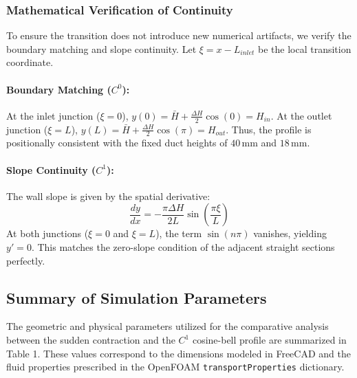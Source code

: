 \documentclass[12pt, a4paper]{article}
\begin{document}
\subsubsection{Mathematical Verification of Continuity}
To ensure the transition does not introduce new numerical artifacts, we verify the boundary matching and slope continuity. Let $\xi = x - L_{inlet}$ be the local transition coordinate.

\paragraph{Boundary Matching ($C^0$):}
At the inlet junction ($\xi = 0$), $y(0) = \bar{H} + \frac{\Delta H}{2}\cos(0) = H_{in}$. At the outlet junction ($\xi = L$), $y(L) = \bar{H} + \frac{\Delta H}{2}\cos(\pi) = H_{out}$. Thus, the profile is positionally consistent with the fixed duct heights of $40\,\text{mm}$ and $18\,\text{mm}$.

\paragraph{Slope Continuity ($C^1$):}
The wall slope is given by the spatial derivative:
\begin{equation}
	\frac{dy}{dx} = -\frac{\pi \Delta H}{2L} \sin\left( \frac{\pi \xi}{L} \right)
\end{equation}
At both junctions ($\xi=0$ and $\xi=L$), the term $\sin(n\pi)$ vanishes, yielding $y' = 0$. This matches the zero-slope condition of the adjacent straight sections perfectly.

\subsection{Summary of Simulation Parameters}

The geometric and physical parameters utilized for the comparative analysis between the sudden contraction and the $C^1$ cosine-bell profile are summarized in Table 1. These values correspond to the dimensions modeled in FreeCAD and the fluid properties prescribed in the OpenFOAM \texttt{transportProperties} dictionary\cite{openfoam2404}.
\end{document}
